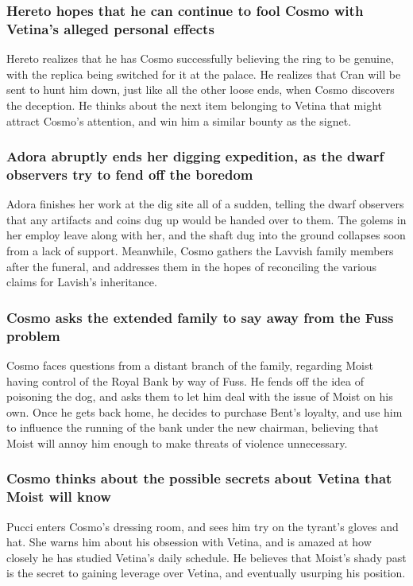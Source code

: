\subsubsection{\Gls{Hereto} hopes that he can continue to fool \Gls{Cosmo} with \Gls{Vetina}'s
    alleged personal effects}
\Gls{Hereto} realizes that he has \Gls{Cosmo} successfully believing the ring to be genuine, with
the replica being switched for it at the palace. He realizes that \Gls{Cran} will be sent to hunt
him down, just like all the other loose ends, when \Gls{Cosmo} discovers the deception. He thinks
about the next item belonging to \Gls{Vetina} that might attract \Gls{Cosmo}'s attention, and win
him a similar bounty as the signet.

\subsubsection{\Gls{Adora} abruptly ends her digging expedition, as the dwarf observers try to fend
    off the boredom}
\Gls{Adora} finishes her work at the dig site all of a sudden, telling the dwarf observers that
any artifacts and coins dug up would be handed over to them. The golems in her employ leave along
with her, and the shaft dug into the ground collapses soon from a lack of support. Meanwhile,
\Gls{Cosmo} gathers the Lavvish family members after the funeral, and addresses them in the hopes of
reconciling the various claims for \Gls{Lavish}'s inheritance.

\subsubsection{\Gls{Cosmo} asks the extended family to say away from the \Gls{Fuss} problem}
\Gls{Cosmo} faces questions from a distant branch of the family, regarding \Gls{Moist} having
control of the Royal Bank by way of \Gls{Fuss}. He fends off the idea of poisoning the dog, and
asks them to let him deal with the issue of \Gls{Moist} on his own. Once he gets back home, he
decides to purchase \Gls{Bent}'s loyalty, and use him to influence the running of the bank under
the new chairman, believing that \Gls{Moist} will annoy him enough to make threats of violence
unnecessary.

\subsubsection{\Gls{Cosmo} thinks about the possible secrets about \Gls{Vetina} that \Gls{Moist}
    will know}
\Gls{Pucci} enters \Gls{Cosmo}'s dressing room, and sees him try on the tyrant's gloves and
hat. She warns him about his obsession with \Gls{Vetina}, and is amazed at how closely he has
studied \Gls{Vetina}'s daily schedule. He believes that \Gls{Moist}'s shady past is the secret to
gaining leverage over \Gls{Vetina}, and eventually usurping his position.

